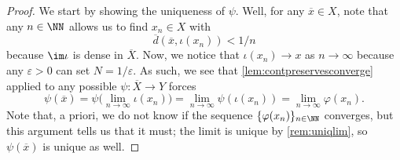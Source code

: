 \documentclass[../notes.tex]{subfiles}
\begin{document}
\begin{proof}
	We start by showing the uniqueness of $\psi$. Well, for any $\overline x\in X$, note that any $n\in\NN$ allows us to find $x_n\in X$ with
	\[\overline d(\overline x,\iota(x_n))<1/n\]
	because $\im\iota$ is dense in $\overline X$. Now, we notice that $\iota(x_n)\to x$ as $n\to\infty$ because any $\varepsilon>0$ can set $N=1/\varepsilon$. As such, we see that \autoref{lem:contpreservesconverge} applied to any possible $\psi\colon\overline X\to Y$ forces
	\[\psi(\overline x)=\psi\Big(\lim_{n\to\infty}\iota(x_n)\Big)=\lim_{n\to\infty}\psi(\iota(x_n))=\lim_{n\to\infty}\varphi(x_n).\]
	Note that, a priori, we do not know if the sequence $\{\varphi(x_n)\}_{n\in\NN}$ converges, but this argument tells us that it must; the limit is unique by \autoref{rem:uniqlim}, so $\psi(\overline x)$ is unique as well.


\end{proof}
\end{document}
